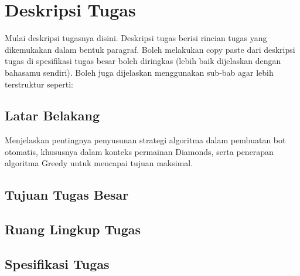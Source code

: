 \newpage
\chapter{Deskripsi Tugas} \label{Bab I}

Mulai deskripsi tugasnya disini. Deskripsi tugas berisi rincian tugas yang dikemukakan dalam bentuk paragraf. Boleh melakukan copy paste dari deskripsi tugas di spesifikasi tugas besar boleh diringkas (lebih baik dijelaskan dengan bahasamu sendiri). Boleh juga dijelaskan menggunakan sub-bab agar lebih terstruktur seperti:
\section{Latar Belakang}
Menjelaskan pentingnya penyusunan strategi algoritma dalam pembuatan bot otomatis, khususnya dalam konteks permainan Diamonds, serta penerapan algoritma Greedy untuk mencapai tujuan maksimal. \par
\section{Tujuan Tugas Besar}
\section{Ruang Lingkup Tugas}
\section{Spesifikasi Tugas}
